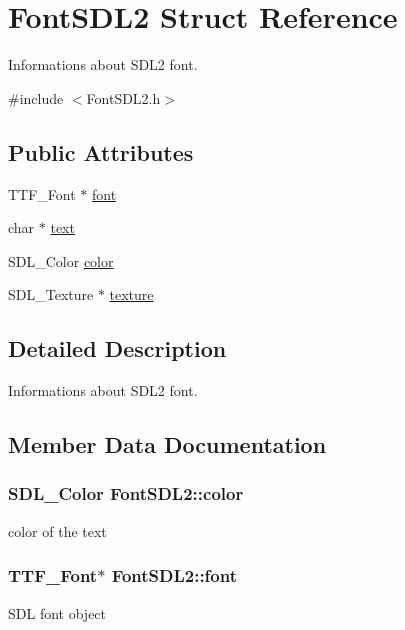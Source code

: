 \hypertarget{structFontSDL2}{}\section{Font\+S\+D\+L2 Struct Reference}
\label{structFontSDL2}


Informations about S\+D\+L2 font.  




{\ttfamily \#include $<$Font\+S\+D\+L2.\+h$>$}

\subsection*{Public Attributes}
\begin{DoxyCompactItemize}
\item 
T\+T\+F\+\_\+\+Font $\ast$ \hyperlink{structFontSDL2_a4473d0cf1fe867daeabb4106962d355e}{font}
\item 
char $\ast$ \hyperlink{structFontSDL2_a2ebfe0c160217282ef912e1785894c2c}{text}
\item 
S\+D\+L\+\_\+\+Color \hyperlink{structFontSDL2_a8d430ac82b5ffff6c9e6c575328dca22}{color}
\item 
S\+D\+L\+\_\+\+Texture $\ast$ \hyperlink{structFontSDL2_af8f18f11af2195bd21d120426ba89750}{texture}
\end{DoxyCompactItemize}


\subsection{Detailed Description}
Informations about S\+D\+L2 font. 

\subsection{Member Data Documentation}
\subsubsection[{\texorpdfstring{color}{color}}]{\setlength{\rightskip}{0pt plus 5cm}S\+D\+L\+\_\+\+Color Font\+S\+D\+L2\+::color}\hypertarget{structFontSDL2_a8d430ac82b5ffff6c9e6c575328dca22}{}\label{structFontSDL2_a8d430ac82b5ffff6c9e6c575328dca22}
color of the text 
\subsubsection[{\texorpdfstring{font}{font}}]{\setlength{\rightskip}{0pt plus 5cm}T\+T\+F\+\_\+\+Font$\ast$ Font\+S\+D\+L2\+::font}\hypertarget{structFontSDL2_a4473d0cf1fe867daeabb4106962d355e}{}\label{structFontSDL2_a4473d0cf1fe867daeabb4106962d355e}
S\+DL font object 
